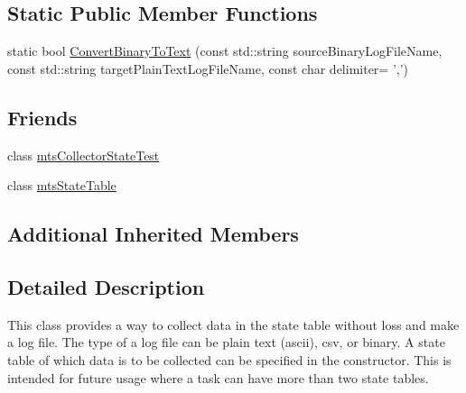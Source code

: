 \subsection*{Static Public Member Functions}
\begin{DoxyCompactItemize}
\item 
static bool \hyperlink{classmts_collector_state_ade0730c3367348b548d8cf56384269e7}{Convert\-Binary\-To\-Text} (const std\-::string source\-Binary\-Log\-File\-Name, const std\-::string target\-Plain\-Text\-Log\-File\-Name, const char delimiter= ',')
\end{DoxyCompactItemize}
\subsection*{Friends}
\begin{DoxyCompactItemize}
\item 
class \hyperlink{classmts_collector_state_a9e2828100f64238c027a54e6a38b8307}{mts\-Collector\-State\-Test}
\item 
class \hyperlink{classmts_collector_state_af4d045a97beae5ceb1642100f69e82c9}{mts\-State\-Table}
\end{DoxyCompactItemize}
\subsection*{Additional Inherited Members}


\subsection{Detailed Description}
This class provides a way to collect data in the state table without loss and make a log file. The type of a log file can be plain text (ascii), csv, or binary. A state table of which data is to be collected can be specified in the constructor. This is intended for future usage where a task can have more than two state tables. 

